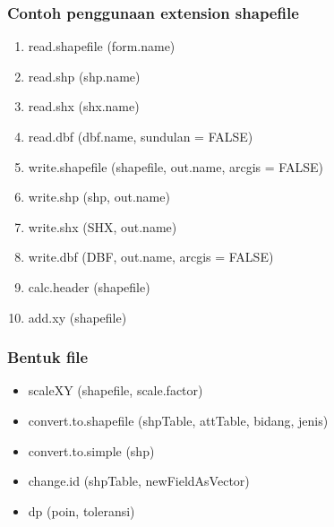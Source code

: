 \subsubsection{Contoh penggunaan extension shapefile}
\begin{enumerate}
    \item read.shapefile (form.name) 
    \item read.shp (shp.name) 
    \item read.shx (shx.name)
    \item read.dbf (dbf.name, sundulan = FALSE)
    \item write.shapefile (shapefile, out.name, arcgis = FALSE) 
    \item write.shp (shp, out.name) 
    \item write.shx (SHX, out.name)
    \item write.dbf (DBF, out.name, arcgis = FALSE) 
    \item calc.header (shapefile) 
    \item add.xy (shapefile)
\end{enumerate}
\subsubsection{Bentuk file}
\begin{itemize}
    \item scaleXY (shapefile, scale.factor)
    \item convert.to.shapefile (shpTable, attTable, bidang, jenis) 
    \item convert.to.simple (shp)
    \item change.id (shpTable, newFieldAsVector) 
    \item dp (poin, toleransi)
\end{itemize}

